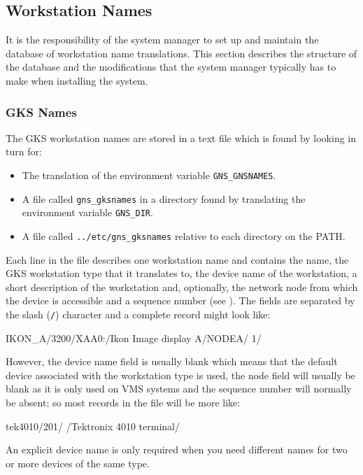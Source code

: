 \documentclass[twoside,11pt,nolof]{starlink}
\begin{document}
\subsection{Workstation Names}\label{dwn}

It is the responsibility of the system manager to set up and maintain the
database of workstation name translations.
This section describes the structure of the database and the modifications
that the system manager typically has to make when installing the system.

\subsubsection{GKS Names}\label{GKS-names}

The GKS workstation names are stored in a text file which is found by looking
in turn for:
\begin{itemize}
\item The translation of the environment variable \texttt{GNS\_GNSNAMES}.
\item A file called \texttt{gns\_gksnames} in a directory found by
translating the environment variable \texttt{GNS\_DIR}.
\item A file called \texttt{../etc/gns\_gksnames} relative to each directory
on the PATH.
\end{itemize}
Each line in the file describes one workstation name
and contains the name, the GKS workstation type that it translates to, the
device name of the workstation, a short description of the workstation and,
optionally, the network node from which the device is accessible and a
sequence number (see ). The
fields are separated by the slash ({\tt/}) character and a complete record
might look like:
\begin{terminalv}
IKON_A/3200/XAA0:/Ikon Image display A/NODEA/ 1/
\end{terminalv}
However, the device name field is usually blank which means that the
default device associated with the workstation type is used, the node field
will usually be blank as it is only used on VMS systems
and the sequence number will normally be absent;
so most records in the file will be more like:
\begin{terminalv}
tek4010/201/ /Tektronix 4010 terminal/
\end{terminalv}
An explicit device name is only required when you need different names for two
or more devices of the same type.
\end{document}
